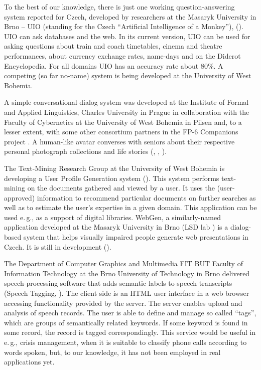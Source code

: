 \begin{multicols}{2}
To the best of our knowledge, there is just one working question-answering system reported for Czech, developed by researchers at the Masaryk University in Brno – UIO (standing for the Czech “Artificial Intelligence of a Monkey”), (\cite{Svoboda2003}). UIO can ask databases and the web. In its current version, UIO can be used for asking questions about train and coach timetables, cinema and theatre performances, about currency exchange rates, name-days and on the Diderot Encyclopedia. For all domains UIO has an accuracy rate about 80\%. A competing (so far no-name) system is being developed at the University of West Bohemia.

A simple conversational dialog system was developed at the Institute of Formal and Applied Linguistics, Charles University in Prague in collaboration with the Faculty of Cybernetics at the University of West Bohemia in Pilsen and, to a lesser extent, with some other consortium partners in the FP-6 Companions project \cite{Note21}. A human-like avatar converses with seniors about their respective personal photograph collections and life stories (\cite{Ptacek2010}, \cite{Romportl2010}, \cite{GruberTihelka2010}).

The Text-Mining Research Group at the University of West Bohemia is developing a User Profile Generation system (\cite{Grolmus2003}). This system performs text-mining on the documents gathered and viewed by a user. It uses the (user-approved) information to recommend particular documents on further searches as well as to estimate the user’s expertise in a given domain. This application can be used e.\,g., as a support of digital libraries.
WebGen, a similarly-named application developed at the Masaryk University in Brno (LSD lab \cite{Note22}) is a dialog-based system that helps visually impaired people generate web presentations in Czech. It is still in development (\cite{BartekPlhak2008}).

The Department of Computer Graphics and Multimedia FIT BUT Faculty of Information Technology at the Brno University of Technology in Brno delivered speech-processing software that adds semantic labels to speech transcripts (Speech Tagging, \cite{Smrz2010}). The client side is an HTML user interface in a web browser accessing functionality provided by the server. The server enables upload and analysis of speech records. The user is able to define and manage so called ``tags'', which are groups of semantically related keywords. If some keyword is found in some record, the record is tagged correspondingly. This service would be useful in e.\,g., crisis management, when it is suitable to classify phone calls according to words spoken, but, to our knowledge, it has not been employed in real applications yet.


\end{multicols}
